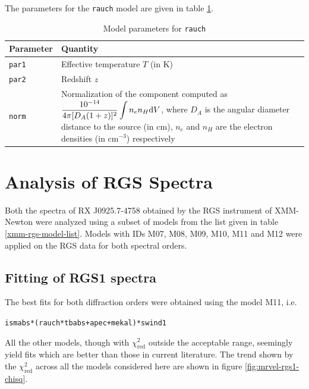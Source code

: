 				The parameters for the \texttt{rauch} model are given in table \ref{param:rauch}.
				\begin{table}[h!]
					\centering
					\caption{Model parameters for \texttt{rauch}}
					\label{param:rauch}
					\begin{tabular}{|p{3cm}|p{10cm}|}
						\hline
						\textbf{Parameter} & \textbf{Quantity} \\ \hline
						{\texttt{par1}} & {Effective temperature $T$ (in K)} \\ \hline
						{\texttt{par2}} & {Redshift $z$} \\ \hline
						{\texttt{norm}} & {Normalization of the component computed as $\displaystyle\dfrac{10^{-14}}{4\pi[D_A(1+z)]^2}\int{n_en_H\mathrm{d}V}$, where $D_A$ is the angular diameter distance to the source (in cm), $n_e$ and $n_H$ are the electron densities (in cm$^{-3}$) respectively} \\ \hline
					\end{tabular}
				\end{table}
	
	\section{Analysis of RGS Spectra} \label{hi-resolution:analysis}
		Both the spectra of RX J0925.7-4758 obtained by the RGS instrument of XMM-Newton were analyzed using a subset of models from the list given in table \ref{xmm-rgs-model-list}. Models with IDs M07, M08, M09, M10, M11 and M12 were applied on the RGS data for both spectral orders.
		
		\subsection{Fitting of RGS1 spectra} \label{hi-resolution:analysis:rgs1}
			The best fits for both diffraction orders were obtained using the model M11, i.e.
			\begin{center}
				\texttt{ismabs*(rauch*tbabs+apec+mekal)*swind1}
			\end{center}
			All the other models, though with $\chi^2_\text{red}$ outside the acceptable range, seemingly yield fits which are better than those in current literature. The trend shown by the $\chi^2_\text{red}$ across all the models considered here are shown in figure \ref{fig:mrvel-rgs1-chisq}.
			
